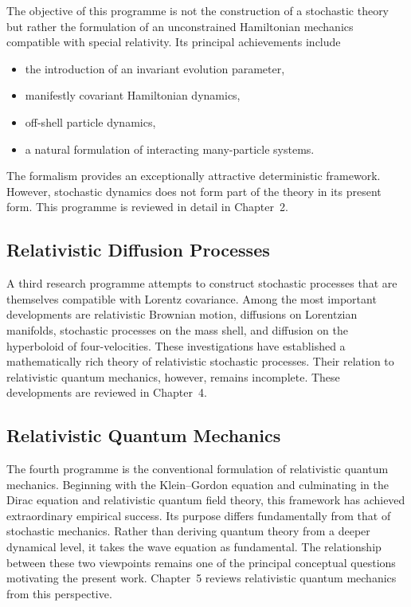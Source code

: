 The objective of this programme is not the construction of a stochastic
theory but rather the formulation of an unconstrained Hamiltonian
mechanics compatible with special relativity.
Its principal achievements include
\begin{itemize}
\item the introduction of an invariant evolution parameter,
\item manifestly covariant Hamiltonian dynamics,
\item off-shell particle dynamics,
\item a natural formulation of interacting many-particle systems.
\end{itemize}
The formalism provides an exceptionally attractive deterministic
framework.
However, stochastic dynamics does not form part of the theory in its
present form.
This programme is reviewed in detail in Chapter~2.
\subsection{Relativistic Diffusion Processes}
A third research programme attempts to construct stochastic processes
that are themselves compatible with Lorentz covariance.
Among the most important developments are relativistic Brownian motion,
diffusions on Lorentzian manifolds, stochastic processes on the mass
shell, and diffusion on the hyperboloid of four-velocities.
These investigations have established a mathematically rich theory of
relativistic stochastic processes.
Their relation to relativistic quantum mechanics, however, remains
incomplete.
These developments are reviewed in Chapter~4.
\subsection{Relativistic Quantum Mechanics}
The fourth programme is the conventional formulation of relativistic
quantum mechanics.
Beginning with the Klein--Gordon equation and culminating in the Dirac
equation and relativistic quantum field theory, this framework has
achieved extraordinary empirical success.
Its purpose differs fundamentally from that of stochastic mechanics.
Rather than deriving quantum theory from a deeper dynamical level, it
takes the wave equation as fundamental.
The relationship between these two viewpoints remains one of the
principal conceptual questions motivating the present work.
Chapter~5 reviews relativistic quantum mechanics from this perspective.
